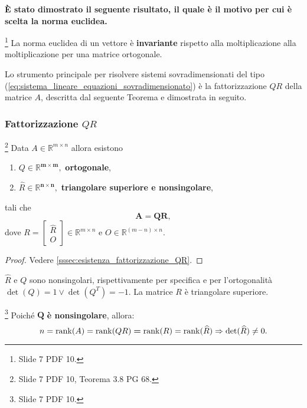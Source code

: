 \textbf{È stato dimostrato il seguente risultato, il quale è il motivo per cui è scelta la norma euclidea.}

\begin{theorem}\footnote{Slide 7 PDF 10.}
    La norma euclidea di un vettore è \textbf{invariante} rispetto alla moltiplicazione alla moltiplicazione per una matrice ortogonale.
\end{theorem}

Lo strumento principale per risolvere sistemi sovradimensionati del tipo (\ref{eq:sistema_lineare_equazioni_sovradimensionato}) è la fattorizzazione $QR$ della matrice $A$, descritta dal seguente Teorema e dimostrata in seguito.

\subsubsection{Fattorizzazione \texorpdfstring{$QR$}{QR}}
\begin{theorem}\label{th:esistenza_fattorizzazione_QR}\footnote{Slide 7 PDF 10, Teorema 3.8 PG 68.}
    Data $A\in\mathbb R^{m\times n}$ allora esistono
    \begin{enumerate}
        \item $Q\in\mathbb R^{\boldsymbol{m\times m}},$ \textbf{ortogonale},
        \item $\widehat R\in\mathbb R^{\boldsymbol{n\times n}},$ \textbf{triangolare superiore e \gls{nonsingolare}},
    \end{enumerate}
    tali che
    \begin{equation}\label{eq:fattorizzazione_QR}
        \boldsymbol{A=QR},
    \end{equation}
    dove $R =
    \begin{bmatrix}
    	\widehat R\\
    	O
    \end{bmatrix}\in \mathbb R^{m\times n}$ e $O\in\mathbb R^{(m-n)\times n}$.
\end{theorem}
\begin{proof}
	Vedere \ref{sssec:esistenza_fattorizzazione_QR}.
\end{proof}

$\widehat R$ e $Q$ sono nonsingolari, rispettivamente per specifica e per l'ortogonalità $\det(Q)=1\vee \det(Q^T)=-1$. La matrice $R$ è triangolare superiore.

\begin{remark}\label{rem:fattorizzazione_QR_nonsingolare}\footnote{Slide 7 PDF 10.}
    Poiché $\boldsymbol Q$ \textbf{è \gls{nonsingolare}}, allora:
    \begin{equation*}
        n = \operatorname{rank}(A) = \operatorname{rank} (QR) \boldsymbol = \operatorname{rank}(R) = \operatorname{rank}(\widehat R)\Rightarrow \det(\widehat R)\neq 0.
    \end{equation*}
\end{remark}

